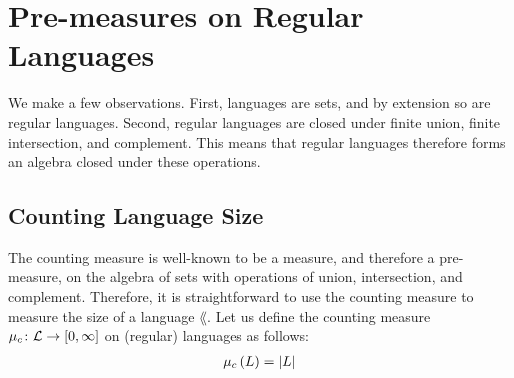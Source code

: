 \section{Pre-measures on Regular Languages}
We make a few observations.
First, languages are sets, and by extension so are regular languages.
Second, regular languages are closed under
finite union, finite intersection, and complement.
This means that regular languages therefore forms an algebra
closed under these operations.

\subsection{Counting Language Size}
The counting measure is well-known to be a measure,
and therefore a pre-measure, on the algebra of sets
with operations of union, intersection, and complement.
Therefore, it is straightforward to use the counting measure to measure
the size of a language \(\lang\).
Let us define the counting measure
\(\mu_{c} \colon \mathcal{L} \rightarrow \left[0, \infty\right]\)
on (regular) languages as follows:
\begin{align*}
  \mu_{c}\left(L\right) = \left\lvert L\right\rvert
\end{align*}



